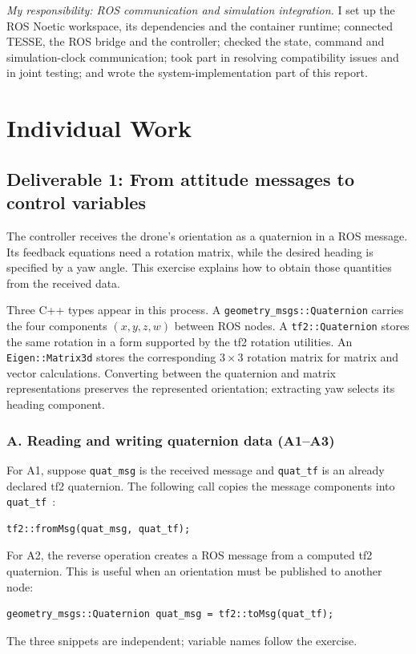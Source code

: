 \documentclass[12pt,a4paper,twoside]{article}
\begin{document}
\textit{My responsibility: ROS communication and simulation integration.} I set up the ROS Noetic workspace, its dependencies and the container runtime; connected TESSE, the ROS bridge and the controller; checked the state, command and simulation-clock communication; took part in resolving compatibility issues and in joint testing; and wrote the system-implementation part of this report.

\section{Individual Work}
\subsection{Deliverable 1: From attitude messages to control variables}
The controller receives the drone's orientation as a quaternion in a ROS message. Its feedback equations need a rotation matrix, while the desired heading is specified by a yaw angle. This exercise explains how to obtain those quantities from the received data.

Three C++ types appear in this process. A \texttt{geometry\_msgs::Quaternion} carries the four components $(x,y,z,w)$ between ROS nodes. A \texttt{tf2::Quaternion} stores the same rotation in a form supported by the tf2 rotation utilities. An \texttt{Eigen::Matrix3d} stores the corresponding $3\times3$ rotation matrix for matrix and vector calculations. Converting between the quaternion and matrix representations preserves the represented orientation; extracting yaw selects its heading component.

\subsubsection*{A. Reading and writing quaternion data (A1--A3)}
For A1, suppose \texttt{quat\_msg} is the received message and \texttt{quat\_tf} is an already declared tf2 quaternion. The following call copies the message components into \texttt{quat\_tf}~\citep{rosgeometry}:
\begin{lstlisting}
tf2::fromMsg(quat_msg, quat_tf);
\end{lstlisting}
For A2, the reverse operation creates a ROS message from a computed tf2 quaternion. This is useful when an orientation must be published to another node:
\begin{lstlisting}
geometry_msgs::Quaternion quat_msg = tf2::toMsg(quat_tf);
\end{lstlisting}
The three snippets are independent; variable names follow the exercise.
\end{document}
